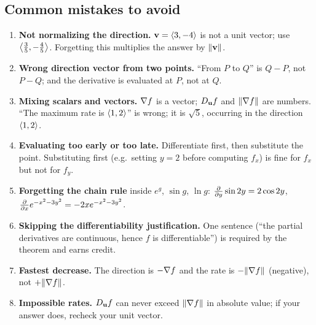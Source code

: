\subsection*{Common mistakes to avoid}

\begin{enumerate}
  \item \textbf{Not normalizing the direction.} $\mathbf{v}=\left\langle 3,-4 \right\rangle$ is not a unit
        vector; use $\left\langle \frac35,-\frac45 \right\rangle$. Forgetting this multiplies the answer
        by $\lVert\mathbf{v}\rVert$.
  \item \textbf{Wrong direction vector from two points.} ``From $P$ to $Q$'' is
        $Q-P$, not $P-Q$; and the derivative is evaluated at $P$, not at $Q$.
  \item \textbf{Mixing scalars and vectors.} $\nabla f$ is a vector; $D_{\mathbf{u}} f$ and
        $\lVert\nabla f\rVert$ are numbers. ``The maximum rate is $\left\langle 1,2 \right\rangle$'' is wrong; it is
        $\sqrt5$, occurring in the direction $\left\langle 1,2 \right\rangle$.
  \item \textbf{Evaluating too early or too late.} Differentiate first, then
        substitute the point. Substituting first (e.g.\ setting $y=2$ before
        computing $f_x$) is fine for $f_x$ but not for $f_y$.
  \item \textbf{Forgetting the chain rule} inside $e^{g}$, $\sin g$, $\ln g$:
        $\frac{\partial }{\partial y}\sin2y=2\cos2y$, $\frac{\partial }{\partial x}e^{-x^2-3y^2}=-2xe^{-x^2-3y^2}$.
  \item \textbf{Skipping the differentiability justification.} One sentence
        (``the partial derivatives are continuous, hence $f$ is
        differentiable'') is required by the theorem and earns credit.
  \item \textbf{Fastest decrease.} The direction is $-\nabla f$ and the rate is
        $-\lVert\nabla f\rVert$ (negative), not $+\lVert\nabla f\rVert$.
  \item \textbf{Impossible rates.} $D_{\mathbf{u}} f$ can never exceed $\lVert\nabla f\rVert$ in
        absolute value; if your answer does, recheck your unit vector.
\end{enumerate}
